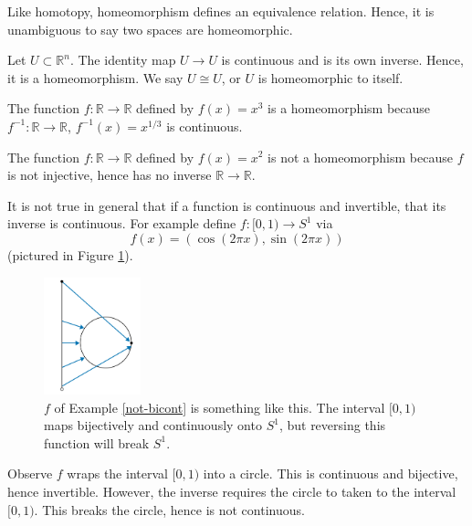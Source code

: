 \documentclass{amsart}
\begin{document}
Like homotopy, homeomorphism defines an
equivalence relation. Hence, it is unambiguous to say two spaces are
homeomorphic.

\begin{example}
   Let \(U\subset\mathbb{R}^n\). The identity map \(U\to U\) is continuous and
	is its own
	inverse. Hence, it is a homeomorphism. We say \(U\cong U\), or \(U\) is
	homeomorphic to itself.
\end{example}

\begin{example}
   The function \(f: \mathbb{R}\to\mathbb{R}\) defined by \(f(x) = x^3\) is a
	homeomorphism because \(f^{-1}: \mathbb{R}\to\mathbb{R}\), \(f^{-1}(x) =
	x^{1/3}\) is continuous.
\end{example}

\begin{example}
   The function \(f: \mathbb{R}\to\mathbb{R}\) defined by \(f(x) = x^2\) is not
	a homeomorphism because \(f\) is not injective, hence has no inverse
	\(\mathbb{R}\to\mathbb{R}\).
\end{example}

\begin{example}\label{not-bicont}
	It is not true in general that if a function is continuous and invertible,
	that its inverse is continuous.
	For example define \(f: [0, 1)\to S^1\) via 
	\[
	   f(x) = (\cos(2\pi x), \sin(2\pi x))
	\] 
	(pictured in Figure \ref{circle-wrap}).

	\begin{figure}[!h]
	   \centering
		\includegraphics[width = 0.25\textwidth]{Inkscape Files/circlewrapping.png}
		\caption{\(f\) of Example \ref{not-bicont} is something like this.
		The interval \([0, 1)\) maps bijectively and continuously onto \(S^1\),
		but reversing this function will break \(S^1\).}
		\label{circle-wrap}
	\end{figure}

	Observe \(f\) wraps the interval
	\([0, 1)\) into a circle. This is
	continuous and
	bijective, hence invertible. However, the inverse requires the circle to
	taken to the interval \([0, 1)\). This breaks the circle, hence is not
	continuous.
\end{example}
\end{document}
